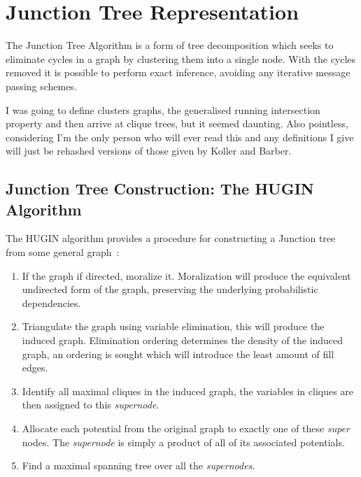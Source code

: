 

\section{Junction Tree Representation}
\label{section:cluster_graph}
The Junction Tree Algorithm is a form of tree decomposition which seeks to eliminate cycles in a graph by clustering them into a single node. With the cycles removed  it is possible to perform exact inference, avoiding any iterative message passing schemes.

\begin{remark}
I was going to define clusters graphs, the generalised running intersection property and then arrive at clique trees, but it seemed daunting. Also pointless, considering I'm the only person who will ever read this and any definitions I give will just be rehashed versions of those given by Koller and Barber.
\end{remark}


\subsection{Junction Tree Construction: The HUGIN Algorithm}
\label{subsection:jtree_construction}
The HUGIN algorithm provides a procedure for constructing a Junction tree from some general graph~\cite{Du_Preez_week5}:

\begin{enumerate}
\item If the graph if directed, moralize it. Moralization will produce the equivalent undirected form of the graph, preserving the underlying probabilistic dependencies.
\item Triangulate the graph using variable elimination, this will produce the induced graph. Elimination ordering determines the density of the induced graph, an ordering is sought which will introduce the least amount of fill edges.
\item Identify all maximal cliques in the induced graph, the variables in cliques are then assigned to this \textit{supernode}.
\item Allocate each potential from the original graph to exactly one of these \textit{super} nodes. The \textit{supernode} is simply a product of all of its associated potentials.
\item Find a maximal spanning tree over all the \textit{supernodes}.
\end{enumerate}

